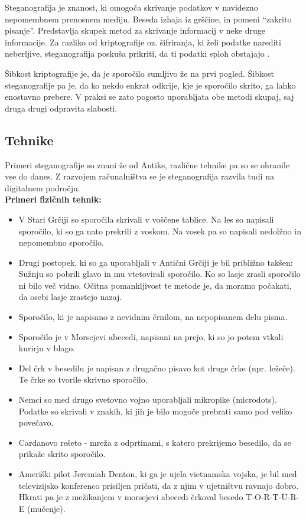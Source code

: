 Steganografija je znanost, ki omogoča skrivanje podatkov v navidezno nepomembnem prenosnem mediju. Beseda izhaja iz grščine, in pomeni ``zakrito pisanje''. Predstavlja skupek metod za skrivanje informacij v neke druge informacije. Za razliko od kriptografije oz. šifriranja, ki želi podatke narediti neberljive, steganografija poskuša prikriti, da ti podatki sploh obstajajo \cite{monitor}.

Šibkost kriptografije je, da je sporočilo sumljivo že na prvi pogled. Šibkost steganografije pa je, da ko nekdo enkrat odkrije, kje je sporočilo skrito, ga lahko enostavno prebere. V praksi se zato pogosto uporabljata obe metodi skupaj, saj druga drugi odpravita slabosti.

\subsection{Tehnike}
    Primeri steganografije so znani že od Antike, različne tehnike pa so se ohranile vse do danes. Z razvojem računalništva se je steganografija razvila tudi na digitalnem področju.\\

    \textbf{Primeri fizičnih tehnik:}
    \begin{itemize}
        \item V Stari Grčiji so sporočila skrivali v voščene tablice. Na les so napisali sporočilo, ki so ga nato prekrili z voskom. Na vosek pa so napisali nedolžno in nepomembno sporočilo.
        \item Drugi postopek, ki so ga uporabljali v Antični Grčiji je bil približno takšen: Sužnju so pobrili glavo in mu vtetovirali sporočilo. Ko so lasje zrasli sporočilo ni bilo več vidno. Očitna pomankljivost te metode je, da moramo počakati, da osebi lasje zrastejo nazaj.
        \item Sporočilo, ki je napisano z nevidnim črnilom, na nepopisanem delu pisma.
        \item Sporočilo je v Morsejevi abecedi, napisani na prejo, ki so jo potem vtkali kurirju  v blago.
        \item Del črk v besedilu je napisan z drugačno pisavo kot druge črke (npr. ležeče). Te črke so tvorile skrivno sporočilo. \cite{wikipedia}
        \item Nemci so med drugo svetovno vojno uporabljali mikropike (microdots). Podatke so skrivali v znakih, ki jih je bilo mogoče prebrati samo pod veliko povečavo. \cite{monitor}
        \item Cardanovo rešeto - mreža z odprtinami, s katero prekrijemo besedilo, da se prikaže skrito sporočilo.
        \item Ameriški pilot Jeremiah Denton, ki ga je ujela vietnamska vojska, je bil med televizijsko konferenco prisiljen pričati, da z njim v ujetništvu ravnajo dobro. Hkrati pa je z mežikanjem v morsejevi abecedi črkoval besedo T-O-R-T-U-R-E (mučenje).\cite{delo}
    \end{itemize}

